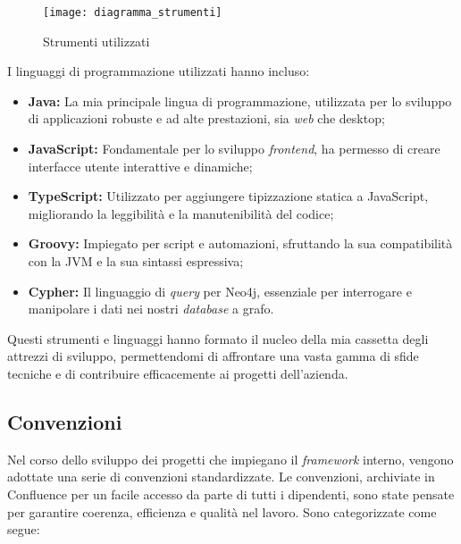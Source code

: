 \begin{figure}[!h] 
  \centering 
  \texttt{[image: diagramma\_strumenti]} 
  \caption{Strumenti utilizzati}
  \label{fig:diagramma_strumenti}
\end{figure}

I linguaggi di programmazione utilizzati hanno incluso:

\begin{itemize}
\item \textbf{Java:} La mia principale lingua di programmazione, utilizzata per lo sviluppo di applicazioni robuste e ad alte prestazioni, sia \textit{web} che desktop;

\item \textbf{JavaScript:} Fondamentale per lo sviluppo \textit{frontend}, ha permesso di creare interfacce utente interattive e dinamiche;

\item \textbf{TypeScript:} Utilizzato per aggiungere tipizzazione statica a JavaScript, migliorando la leggibilità e la manutenibilità del codice;

\item \textbf{Groovy:} Impiegato per script e automazioni, sfruttando la sua compatibilità con la \gls{JVM} e la sua sintassi espressiva;

\item \textbf{Cypher:} Il linguaggio di \textit{query} per Neo4j, essenziale per interrogare e manipolare i dati nei nostri \textit{database} a grafo.
\end{itemize}

Questi strumenti e linguaggi hanno formato il nucleo della mia cassetta degli attrezzi di sviluppo, permettendomi di affrontare una vasta gamma di sfide tecniche e di contribuire efficacemente 
ai progetti dell'azienda.

\subsection{Convenzioni}
Nel corso dello sviluppo dei progetti che impiegano il \textit{framework} interno, vengono adottate una serie di convenzioni standardizzate. 
Le convenzioni, archiviate in Confluence per un facile accesso da parte di tutti i dipendenti, 
sono state pensate per garantire coerenza, efficienza e qualità nel lavoro. Sono categorizzate come segue:

